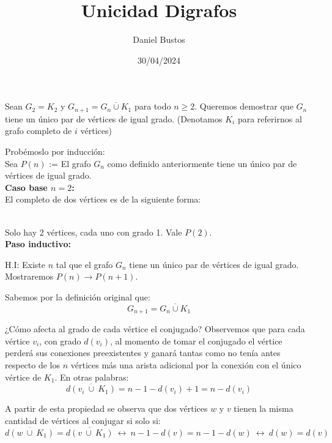 \documentclass{article}
\author{Daniel Bustos}
\title{Unicidad Digrafos}
\date{30/04/2024}
\begin{document}
\maketitle


Sean $G_2 = K_2$ y $G_{n+1} = \overline{G_n \cup K_1}$ para todo $n \geq 2$. Queremos demostrar que $G_n$ tiene un único par de vértices de igual grado. (Denotamos $K_i$ para referirnos al grafo completo de $i$ vértices)

Probémoslo por inducción:\\

Sea $P(n)$ := El grafo $G_n$ como definido anteriormente tiene un único par de vértices de igual grado.\\

\textbf{Caso base $n = 2$:}\\

El completo de dos vértices es de la siguiente forma:
 \\

Solo hay 2 vértices, cada uno con grado 1. Vale $P(2)$.\\

\textbf{Paso inductivo:}

H.I: Existe $n$ tal que el grafo $G_n$ tiene un único par de vértices de igual grado. Mostraremos $P(n) \rightarrow P(n+1)$.

Sabemos por la definición original que:
\[ G_{n+1} = \overline{G_n \cup K_1} \]

¿Cómo afecta al grado de cada vértice el conjugado? Observemos que para cada vértice $v_i$, con grado $d(v_i)$, al momento de tomar el conjugado el vértice perderá sus conexiones preexistentes y ganará tantas como no tenía antes respecto de los $n$ vértices más  una arista adicional por la conexión con el único vértice de $K_1$. En otras palabras:
\[ \overline{d(v_i \ \cup\  K_1)} = n - 1 -d(v_i) + 1 = n - d(v_i) \]

A partir de esta propiedad se observa que dos vértices $w$ y $v$ tienen la misma cantidad de vértices al conjugar si solo si:
\[ \overline{d(w \ \cup\  K_1)} = \overline{d(v \ \cup\  K_1)} \  \leftrightarrow \ n - 1 - d(v) = n - 1 - d(w) \  \leftrightarrow  \ d(w) = d(v) \]
\end{document}
